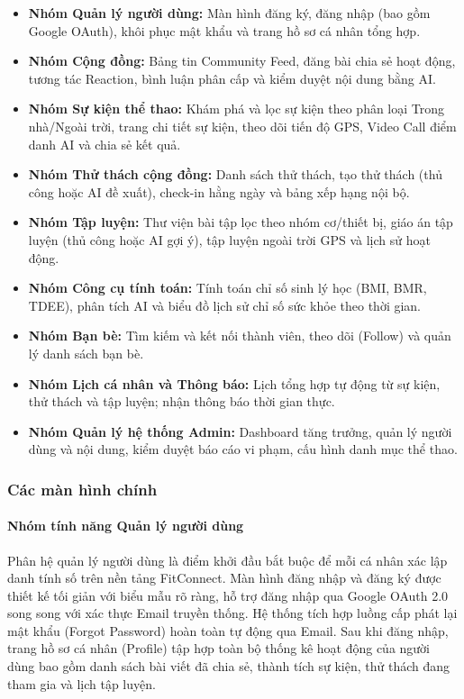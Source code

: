 \begin{itemize}
    \item \textbf{Nhóm Quản lý người dùng:} Màn hình đăng ký, đăng nhập (bao gồm Google OAuth), khôi phục mật khẩu và trang hồ sơ cá nhân tổng hợp.
    \item \textbf{Nhóm Cộng đồng:} Bảng tin Community Feed, đăng bài chia sẻ hoạt động, tương tác Reaction, bình luận phân cấp và kiểm duyệt nội dung bằng AI.
    \item \textbf{Nhóm Sự kiện thể thao:} Khám phá và lọc sự kiện theo phân loại Trong nhà/Ngoài trời, trang chi tiết sự kiện, theo dõi tiến độ GPS, Video Call điểm danh AI và chia sẻ kết quả.
    \item \textbf{Nhóm Thử thách cộng đồng:} Danh sách thử thách, tạo thử thách (thủ công hoặc AI đề xuất), check-in hằng ngày và bảng xếp hạng nội bộ.
    \item \textbf{Nhóm Tập luyện:} Thư viện bài tập lọc theo nhóm cơ/thiết bị, giáo án tập luyện (thủ công hoặc AI gợi ý), tập luyện ngoài trời GPS và lịch sử hoạt động.
    \item \textbf{Nhóm Công cụ tính toán:} Tính toán chỉ số sinh lý học (BMI, BMR, TDEE), phân tích AI và biểu đồ lịch sử chỉ số sức khỏe theo thời gian.
    \item \textbf{Nhóm Bạn bè:} Tìm kiếm và kết nối thành viên, theo dõi (Follow) và quản lý danh sách bạn bè.
    \item \textbf{Nhóm Lịch cá nhân và Thông báo:} Lịch tổng hợp tự động từ sự kiện, thử thách và tập luyện; nhận thông báo thời gian thực.
    \item \textbf{Nhóm Quản lý hệ thống Admin:} Dashboard tăng trưởng, quản lý người dùng và nội dung, kiểm duyệt báo cáo vi phạm, cấu hình danh mục thể thao.
\end{itemize}

\subsubsection{Các màn hình chính}

\paragraph{Nhóm tính năng Quản lý người dùng}
Phân hệ quản lý người dùng là điểm khởi đầu bắt buộc để mỗi cá nhân xác lập danh tính số trên nền tảng FitConnect. Màn hình đăng nhập và đăng ký được thiết kế tối giản với biểu mẫu rõ ràng, hỗ trợ đăng nhập qua Google OAuth 2.0 song song với xác thực Email truyền thống. Hệ thống tích hợp luồng cấp phát lại mật khẩu (Forgot Password) hoàn toàn tự động qua Email. Sau khi đăng nhập, trang hồ sơ cá nhân (Profile) tập hợp toàn bộ thống kê hoạt động của người dùng bao gồm danh sách bài viết đã chia sẻ, thành tích sự kiện, thử thách đang tham gia và lịch tập luyện.


